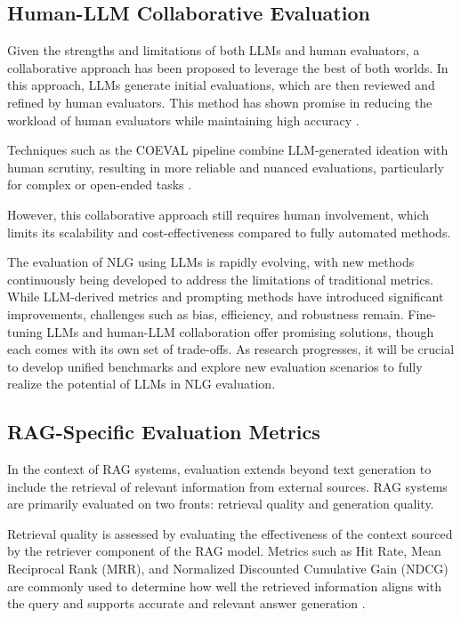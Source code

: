 \subsection{Human-LLM Collaborative Evaluation}

Given the strengths and limitations of both LLMs and human evaluators, a collaborative approach has been proposed to leverage the best of both worlds. In this approach, LLMs generate initial evaluations, which are then reviewed and refined by human evaluators. This method has shown promise in reducing the workload of human evaluators while maintaining high accuracy \cite{li2023collaborative}.

Techniques such as the COEVAL pipeline combine LLM-generated ideation with human scrutiny, resulting in more reliable and nuanced evaluations, particularly for complex or open-ended tasks \cite{zhang2021human}.

However, this collaborative approach still requires human involvement, which limits its scalability and cost-effectiveness compared to fully automated methods.

\newline

The evaluation of NLG using LLMs is rapidly evolving, with new methods continuously being developed to address the limitations of traditional metrics. While LLM-derived metrics and prompting methods have introduced significant improvements, challenges such as bias, efficiency, and robustness remain. Fine-tuning LLMs and human-LLM collaboration offer promising solutions, though each comes with its own set of trade-offs. As research progresses, it will be crucial to develop unified benchmarks and explore new evaluation scenarios to fully realize the potential of LLMs in NLG evaluation.

\subsection{RAG-Specific Evaluation Metrics}

In the context of RAG systems, evaluation extends beyond text generation to include the retrieval of relevant information from external sources. RAG systems are primarily evaluated on two fronts: retrieval quality and generation quality.

Retrieval quality is assessed by evaluating the effectiveness of the context sourced by the retriever component of the RAG model. Metrics such as Hit Rate, Mean Reciprocal Rank (MRR), and Normalized Discounted Cumulative Gain (NDCG) are commonly used to determine how well the retrieved information aligns with the query and supports accurate and relevant answer generation \cite{chakrabarti2003mining}.

